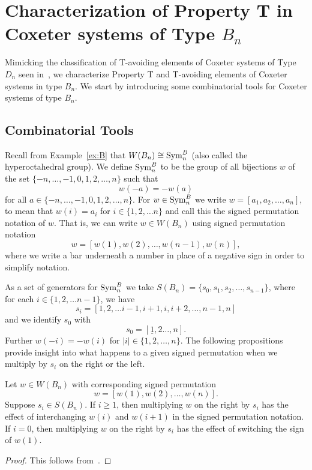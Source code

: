 \chapter{Characterization of Property T in Coxeter systems of Type $B_n$}\label{chap:BnandCn}

Mimicking the classification of T-avoiding elements of Coxeter systems of Type $D_n$ seen in~\cite{Gern2013a}, we characterize Property T and T-avoiding elements of Coxeter systems in type $B_n$. We start by introducing some combinatorial tools for Coxeter systems of type $B_n$. 

\section{Combinatorial Tools}\label{sec:Btools}

Recall from Example~\ref{ex:B} that $W(B_n) \cong \mathrm{Sym}_n^B$ (also called the hyperoctahedral group). We define $\mathrm{Sym}_n^B$ to be the group of all bijections $w$ of the set $\{-n, \ldots, -1, 0, 1, 2, \ldots, n\}$ such that 
\[w(-a)=-w(a)\] for all $a \in \{-n, \ldots, -1, 0, 1, 2, \ldots, n\}$. For $w \in \mathrm{Sym}_n^B$ we write $w=[a_1, a_2, \ldots, a_n]$, to mean that $w(i)=a_i$ for $i \in \{1,2, \ldots n\}$ and call this the signed permutation notation of $w$. That is, we can write $w \in W(B_n)$ using signed permutation notation 
\[ w=[w(1),w(2), \ldots, w(n-1), w(n)], \]
where we write a bar underneath a number in place of a negative sign in order to simplify notation. 

As a set of generators for $\mathrm{Sym}_n^B$ we take $S(B_n)=\{s_0,s_1,s_2, \ldots, s_{n-1}\}$, where for each $i \in \{1,2,\ldots n-1\}$, we have
\[s_i=[1,2, \ldots i-1, i+1,i,i+2, \ldots, n-1,n] \] and we identify $s_0$ with
\[s_0=[\underline{1}, 2 \ldots, n].\] Further $w(-i)=-w(i)$ for $|i| \in \{1,2, \ldots, n\}$. The following propositions provide insight into what happens to a given signed permutation when we multiply by $s_i$ on the right or the left.

\begin{proposition}
	Let $w \in W(B_n)$ with corresponding signed permutation 
	\[w=[w(1),w(2), \ldots ,w(n)].\] Suppose $s_i \in S(B_n)$. If $i \geq 1$, then multiplying $w$ on the right by $s_i$ has the effect of interchanging $w(i)$ and $w(i+1)$ in  the signed permutation notation. If $i=0$, then multiplying $w$ on the right by $s_i$ has the effect of switching the sign of $w(1)$. 	
	\begin{proof}
	This follows from~\cite[Section 8.1 and A3.1]{Bjorner2005}.	
	\end{proof}
\end{proposition}

